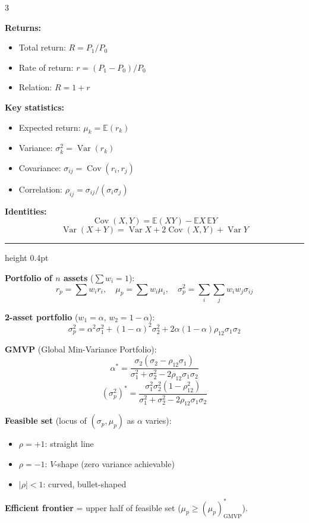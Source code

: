 \documentclass[9pt, a4paper, landscape]{extarticle}
\newcommand{\chbox}[2]{%
  \begin{tcolorbox}[sheet, title={\bfseries\small #1}]
  #2
  \end{tcolorbox}%
}
\newcommand{\boxrule}{\vspace{3pt}\textcolor{ruleclr}{\hrule height 0.4pt}\vspace{3pt}}
\newcommand{\E}{\mathbb{E}}
\newcommand{\op}[1]{\operatorname{#1}}
\begin{document}
\begin{multicols}{3}
{\textbf{Returns:}
\begin{itemize}
  \item Total return:\; $R = P_1/P_0$
  \item Rate of return:\; $r = (P_1-P_0)/P_0$
  \item Relation:\; $R = 1 + r$
\end{itemize}

\textbf{Key statistics:}
\begin{itemize}
  \item Expected return:\; $\mu_k = \E(r_k)$
  \item Variance:\; $\sigma_k^2 = \op{Var}(r_k)$
  \item Covariance:\; $\sigma_{ij} = \op{Cov}(r_i,r_j)$
  \item Correlation:\; $\rho_{ij} = \sigma_{ij}/(\sigma_i\sigma_j)$
\end{itemize}

\textbf{Identities:}
\[
\op{Cov}(X,Y)=\E(XY)-\E X\,\E Y
\]
\[
\op{Var}(X+Y)=\op{Var}X+2\op{Cov}(X,Y)+\op{Var}Y
\]

\boxrule

\textbf{Portfolio of $n$ assets} ($\sum w_i=1$):
\[
r_p=\sum w_ir_i,\quad
\mu_p=\sum w_i\mu_i,\quad
\sigma_p^2=\sum_i\sum_j w_iw_j\sigma_{ij}
\]

\textbf{2-asset portfolio} ($w_1=\alpha$, $w_2=1-\alpha$):
\[
\sigma_p^2=\alpha^2\sigma_1^2+(1-\alpha)^2\sigma_2^2+2\alpha(1-\alpha)\rho_{12}\sigma_1\sigma_2
\]

\textbf{GMVP} (Global Min-Variance Portfolio):
\[
\alpha^*=\frac{\sigma_2(\sigma_2-\rho_{12}\sigma_1)}{\sigma_1^2+\sigma_2^2-2\rho_{12}\sigma_1\sigma_2}
\]
\[
(\sigma_p^2)^*=\frac{\sigma_1^2\sigma_2^2(1-\rho_{12}^2)}{\sigma_1^2+\sigma_2^2-2\rho_{12}\sigma_1\sigma_2}
\]

\textbf{Feasible set} (locus of $(\sigma_p,\mu_p)$ as $\alpha$ varies):
\begin{itemize}
  \item $\rho=+1$:\; straight line
  \item $\rho=-1$:\; $V$-shape (zero variance achievable)
  \item $|\rho|<1$:\; curved, bullet-shaped
\end{itemize}

\textbf{Efficient frontier} = upper half of feasible set ($\mu_p\ge(\mu_p)^*_{\text{GMVP}}$).
}

\chbox{Chapter 4 --- Forwards \& Futures}{

}
\end{multicols}
\end{document}
